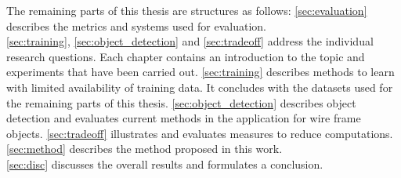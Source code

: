 The remaining parts of this thesis are structures as follows: \autoref{sec:evaluation} describes the metrics and systems used for evaluation.\\
 \autoref{sec:training}, \autoref{sec:object_detection} and \autoref{sec:tradeoff} address the individual research questions. Each chapter contains an introduction to the topic and experiments that have been carried out. \autoref{sec:training} describes methods to learn with limited availability of training data. It concludes with the datasets used for the remaining parts of this thesis.  \autoref{sec:object_detection} describes object detection and evaluates current methods in the application for wire frame objects.
\autoref{sec:tradeoff} illustrates and evaluates measures to reduce computations.
\autoref{sec:method} describes the method proposed in this work.\\
\autoref{sec:disc} discusses the overall results and formulates a conclusion.
